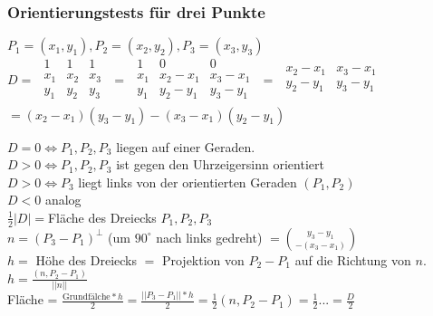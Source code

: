 \subsubsection{Orientierungstests für drei Punkte}
$P_1= (x_1,y_1),P_2= (x_2,y_2),P_3= (x_3,y_3)$\\
$D=$
$\begin{matrix}
1 & 1 & 1 \\
x_1 & x_2 & x_3 \\
y_1 & y_2 & y_3 \\
\end{matrix}$
$=$
$\begin{matrix}
1 & 0 & 0\\
x_1 & x_2-x_1 & x_3-x_1\\
y_1 & y_2-y_1 & y_3-y_1\\
\end{matrix}$
$=$
$\begin{matrix}
x_2 -x_1 & x_3-x_1\\
y_2-y_1 & y_3 - y_1\\
\end{matrix}$
$= (x_2-x_1)(y_3-y_1) - (x_3-x_1)(y_2-y_1)$

$D=0 \iff P_1,P_2,P_3$ liegen auf einer Geraden.\\
$D>0 \iff P_1,P_2,P_3$ ist gegen den Uhrzeigersinn orientiert\\
$D>0 \iff P_3$ liegt links von der orientierten Geraden $(P_1,P_2)$\\
$D<0$ analog\\
$\frac{1}{2}|D|=$Fläche des Dreiecks $P_1,P_2,P_3$\\
$n=(P_3-P_1)^\bot$ (um $90^\circ$ nach links gedreht) $= \binom{y_3-y_1}{-(x_3-x_1)}$\\
$h=$ Höhe des Dreiecks $=$ Projektion von $P_2-P_1$ auf die Richtung von $n$.\\
$h=\frac{(n,P_2-P_1)}{||n||}$\\
Fläche = $\frac{\text{Grundfälche}*h}{2} = \frac{||P_3-P_1||*h}{2}=\frac{1}{2}(n,P_2-P_1)=\frac{1}{2}... = \frac{D}{2}$\\
